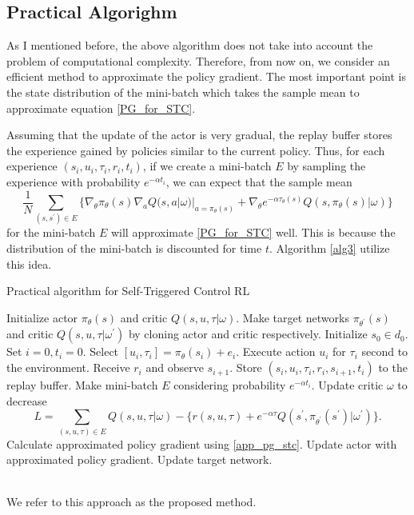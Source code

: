 \documentclass[english, dvipdfmx]{ampmt}             %
\begin{document}
\subsection{Practical Algorighm}
As I mentioned before, the above algorithm does not take into account the problem of computational complexity. Therefore, from now on, we consider an efficient method to approximate the policy gradient. The most important point is the state distribution of the mini-batch which takes the sample mean to approximate equation \eqref{PG_for_STC}. \par
Assuming that the update of the actor is very gradual, the replay buffer stores the experience gained by policies similar to the current policy. Thus, for each experience $(s_i, u_i, \tau_i, r_i, t_i)$, if we create a mini-batch $E$ by sampling the experience with probability $e^{-\alpha t_i}$, we can expect that the sample mean
\begin{equation}
	\frac{1}{N}\sum_{(s, s^{\prime})\in E}\{\nabla_{\theta}\pi_{\theta}(s)\nabla_{a}Q(s,a|\omega)|_{a=\pi_{\theta}(s)}+\nabla_{\theta}e^{-\alpha\tau_{\theta}(s)}Q(s, \pi_{\theta}(s)|\omega)\} \label{app_pg_stc}
\end{equation}
for the mini-batch $E$ will approximate \eqref{PG_for_STC} well. This is because the distribution of the mini-batch is discounted for time $t$. Algorithm \ref{alg3} utilize this idea.
\begin{algorithm}                      
\caption{Practical algorithm for Self-Triggered Control RL}         
\label{alg3}                          
\begin{algorithmic}                  
    \STATE Initialize actor $\pi_{\theta}(s)$ and critic $Q(s,u,\tau|\omega)$.
    \STATE Make target networks $\pi_{\theta^{\prime}}(s)$ and critic $Q(s,u,\tau|\omega^{\prime})$ by cloning actor and critic respectively.
    	\STATE Initialize $s_0\in d_0$.
    	\STATE Set $i = 0, t_i = 0$.
    		\STATE Select $[u_i, \tau_i] = \pi_{\theta}(s_i) + e_i$.
		\STATE Execute action $u_i$ for $\tau_i$ second to the environment.
		\STATE Receive $r_i$ and observe $s_{i+1}$.
		\STATE Store $(s_i, u_i, \tau_i, r_i, s_{i+1}, t_i)$ to the replay buffer.
		\STATE Make mini-batch $E$ considering probability $e^{-\alpha t_i}$.
		\STATE Update critic $\omega$ to decrease 
			\[L = \sum_{(s,u,\tau)\in E}Q(s,u,\tau|\omega) - \{r(s,u,\tau) + e^{-\alpha\tau}Q(s^{\prime}, \pi_{\theta^{\prime}}(s^{\prime})|\omega^{\prime})\}.\] %
		\STATE Calculate approximated policy gradient using \eqref{app_pg_stc}.
		\STATE Update actor with approximated policy gradient.
		\STATE Update target network.
    	\ENDWHILE
    \ENDFOR
\end{algorithmic}
\end{algorithm}\\
We refer to this approach as the proposed method.
\end{document}
